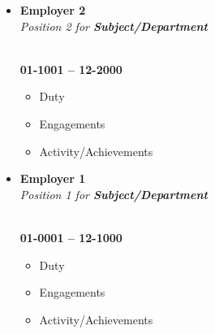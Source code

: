\noindent\makebox[\linewidth]{\rule{\linewidth}{1.1pt}}
\begin{itemize} %
	\item \begin{multicols}{2}
		\begin{flushleft}
			\textbf{\textbf{Employer 2}}
			\\
			\textit{Position 2 for \textbf{Subject/Department}}
		\end{flushleft}
		\columnbreak
		\begin{flushright}
			\hspace*{1mm} \\
			\textbf{01-1001 -- 12-2000}
		\end{flushright}
	\end{multicols}
	
	\begin{itemize}
		\item Duty
		\item Engagements
		\item Activity/Achievements
		
	\end{itemize} 
	
	\item \begin{multicols}{2}
		\begin{flushleft}
			\textbf{\textbf{Employer 1}}
			\\
			\textit{Position 1 for \textbf{Subject/Department}}
		\end{flushleft}
		\columnbreak
		\begin{flushright}
			\hspace*{1mm} \\
			\textbf{01-0001 -- 12-1000}
		\end{flushright}
	\end{multicols}
	
	\begin{itemize}
		\item Duty
		\item Engagements
		\item Activity/Achievements
		
	\end{itemize} 
\end{itemize}